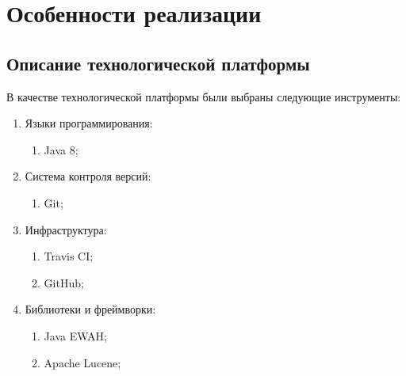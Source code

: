 \documentclass{matmex-diploma}
\begin{document}
\section{Особенности реализации}
    \subsection{Описание технологической платформы}
        В качестве технологической платформы были выбраны следующие инструменты:
        \begin{enumerate}
            \item Языки программирования:
                \begin{enumerate}
                    \item Java 8;
                \end{enumerate}
            \item Система контроля версий:
                \begin{enumerate}
                    \item Git;
                \end{enumerate}
            \item Инфраструктура:
                \begin{enumerate}
                    \item Travis CI;
                    \item GitHub;
                \end{enumerate}
            \item Библиотеки и фреймворки:
                \begin{enumerate}
                    \item Java EWAH;
                    \item Apache Lucene;
                \end{enumerate}    
        \end{enumerate}
        
\end{document}
